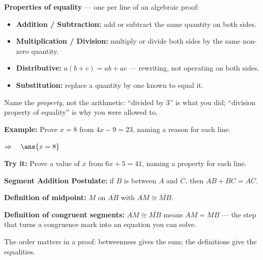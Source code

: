 \documentclass[12pt]{article}
\begin{document}


\begin{formulabox}
\textbf{Properties of equality} --- one per line of an algebraic proof:\par
\begin{itemize}[leftmargin=1.2cm, itemsep=0pt, topsep=1pt]
  \item \textbf{Addition / Subtraction:} add or subtract the same quantity on both sides.
  \item \textbf{Multiplication / Division:} multiply or divide both sides by the same non-zero quantity.
  \item \textbf{Distributive:} $a(b + c) = ab + ac$ --- rewriting, not operating on both sides.
  \item \textbf{Substitution:} replace a quantity by one known to equal it.
\end{itemize}
Name the \emph{property}, not the arithmetic: ``divided by 3'' is what you did; ``division property of equality'' is why you were allowed to.
\end{formulabox}

\begin{examplebox}
\textbf{Example:} \quad Prove $x = 8$ from $4x - 9 = 23$, naming a reason for each line.

$\Rightarrow\quad \ans{x = 8}$
\end{examplebox}

\begin{tryitbox}
\textbf{Try it:} \quad Prove a value of $x$ from $6x + 5 = 41$, naming a property for each line.\\[2pt]
\end{tryitbox}


\begin{formulabox}
\textbf{Segment Addition Postulate:} if $B$ is between $A$ and $C$, then $AB + BC = AC$.\par
\textbf{Definition of midpoint:} $M$ on $\overline{AB}$ with $\overline{AM} \cong \overline{MB}$.\par
\textbf{Definition of congruent segments:} $\overline{AM} \cong \overline{MB}$ means $AM = MB$ --- the step that turns a congruence mark into an equation you can solve.\par
The order matters in a proof: betweenness gives the sum; the definitions give the equalities.
\end{formulabox}
\end{document}
